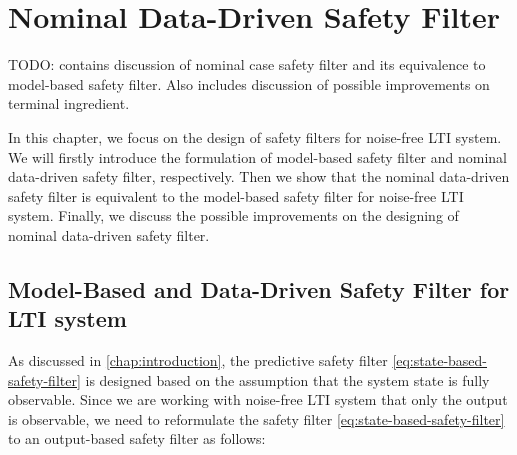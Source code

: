 \chapter{Nominal Data-Driven Safety Filter}\label{chap:nominal-ddsf}
TODO: contains discussion of nominal case safety filter and its equivalence to model-based safety filter. Also includes discussion of possible improvements on terminal ingredient.

In this chapter, we focus on the design of safety filters for noise-free LTI system.
We will firstly introduce the formulation of model-based safety filter and nominal data-driven safety filter, respectively.
Then we show that the nominal data-driven safety filter is equivalent to the model-based safety filter for noise-free LTI system.
Finally, we discuss the possible improvements on the designing of nominal data-driven safety filter.

\section{Model-Based and Data-Driven Safety Filter for LTI system}\label{sec:formulation-nominal}

As discussed in \cref{chap:introduction}, the predictive safety filter \cref{eq:state-based-safety-filter} is designed based on the assumption that the system state is fully observable.
Since we are working with noise-free LTI system that only the output is observable, we need to reformulate the safety filter \cref{eq:state-based-safety-filter} to an output-based safety filter as follows:

